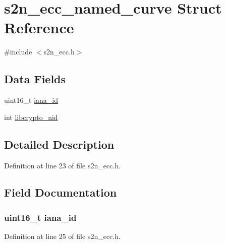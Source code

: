\hypertarget{structs2n__ecc__named__curve}{}\section{s2n\+\_\+ecc\+\_\+named\+\_\+curve Struct Reference}
\label{structs2n__ecc__named__curve}


{\ttfamily \#include $<$s2n\+\_\+ecc.\+h$>$}

\subsection*{Data Fields}
\begin{DoxyCompactItemize}
\item 
uint16\+\_\+t \hyperlink{structs2n__ecc__named__curve_aed2eff88de004a99c7833b5aee330568}{iana\+\_\+id}
\item 
int \hyperlink{structs2n__ecc__named__curve_a3f490463e3deacd512f6e95f6f906b75}{libcrypto\+\_\+nid}
\end{DoxyCompactItemize}


\subsection{Detailed Description}


Definition at line 23 of file s2n\+\_\+ecc.\+h.



\subsection{Field Documentation}
\subsubsection[{\texorpdfstring{iana\+\_\+id}{iana_id}}]{\setlength{\rightskip}{0pt plus 5cm}uint16\+\_\+t iana\+\_\+id}\hypertarget{structs2n__ecc__named__curve_aed2eff88de004a99c7833b5aee330568}{}\label{structs2n__ecc__named__curve_aed2eff88de004a99c7833b5aee330568}


Definition at line 25 of file s2n\+\_\+ecc.\+h.

